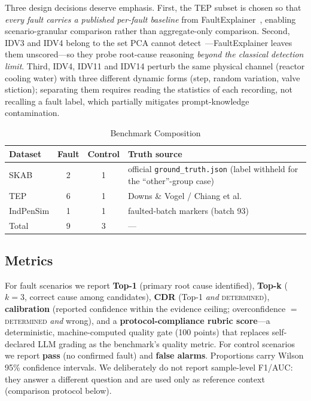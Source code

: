 \documentclass[journal]{IEEEtran}
\begin{document}
Three design decisions deserve emphasis. First, the TEP subset is chosen so that \emph{every fault carries a published per-fault baseline} from FaultExplainer~\cite{khan2024faultexplainer}, enabling scenario-granular comparison rather than aggregate-only comparison. Second, IDV3 and IDV4 belong to the set PCA cannot detect~\cite{chiang2001fault}---FaultExplainer leaves them unscored---so they probe root-cause reasoning \emph{beyond the classical detection limit}. Third, IDV4, IDV11 and IDV14 perturb the same physical channel (reactor cooling water) with three different dynamic forms (step, random variation, valve stiction); separating them requires reading the statistics of each recording, not recalling a fault label, which partially mitigates prompt-knowledge contamination.

\begin{table}[!t]
\caption{Benchmark Composition}
\label{tab:bench}
\centering
\footnotesize
\begin{tabular}{lccp{3.4cm}}
\toprule
Dataset & Fault & Control & Truth source \\
\midrule
SKAB & 2 & 1 & official \texttt{ground\_truth.json} (label withheld for the ``other''-group case) \\
TEP & 6 & 1 & Downs \& Vogel / Chiang et al.~\cite{chiang2001fault} \\
IndPenSim & 1 & 1 & faulted-batch markers (batch 93) \\
\midrule
Total & 9 & 3 & --- \\
\bottomrule
\end{tabular}
\end{table}

\subsection{Metrics}
For fault scenarios we report \textbf{Top-1} (primary root cause identified), \textbf{Top-k} ($k{=}3$, correct cause among candidates), \textbf{CDR} (Top-1 \emph{and} \textsc{determined}), \textbf{calibration} (reported confidence within the evidence ceiling; overconfidence $=$ \textsc{determined} \emph{and} wrong), and a \textbf{protocol-compliance rubric score}---a deterministic, machine-computed quality gate (100 points) that replaces self-declared LLM grading as the benchmark's quality metric. For control scenarios we report \textbf{pass} (no confirmed fault) and \textbf{false alarms}. Proportions carry Wilson 95\% confidence intervals. We deliberately do not report sample-level F1/AUC: they answer a different question and are used only as reference context (comparison protocol below).
\end{document}

